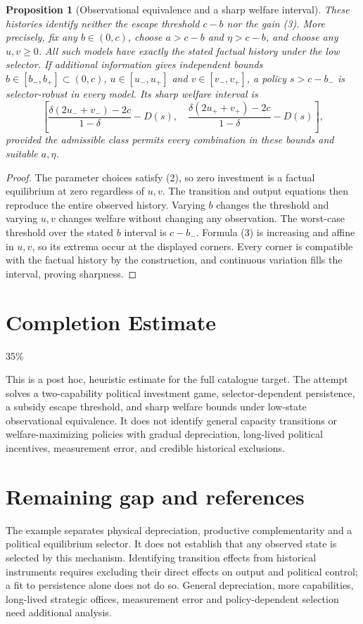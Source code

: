 \documentclass[11pt,a4paper]{article}
\newtheorem{proposition}[theorem]{Proposition}
\theoremstyle{definition}
\theoremstyle{remark}
\begin{document}
\begin{proposition}[Observational equivalence and a sharp welfare interval]
These histories identify neither the escape threshold $c-b$ nor the gain (3). More precisely, fix any $b\in(0,c)$, choose $a>c-b$ and $\eta>c-b$, and choose any $u,v\geq0$. All such models have exactly the stated factual history under the low selector. If additional information gives independent bounds $b\in[b_-,b_+]\subset(0,c)$, $u\in[u_-,u_+]$ and $v\in[v_-,v_+]$, a policy $s>c-b_-$ is selector-robust in every model. Its sharp welfare interval is
\[
 \left[\frac{\delta(2u_-+v_-)-2c}{1-\delta}-D(s),\quad
       \frac{\delta(2u_++v_+)-2c}{1-\delta}-D(s)\right],
\]
provided the admissible class permits every combination in these bounds and suitable $a,\eta$.
\end{proposition}
\begin{proof}
The parameter choices satisfy (2), so zero investment is a factual equilibrium at zero regardless of $u,v$. The transition and output equations then reproduce the entire observed history. Varying $b$ changes the threshold and varying $u,v$ changes welfare without changing any observation. The worst-case threshold over the stated $b$ interval is $c-b_-$. Formula (3) is increasing and affine in $u,v$, so its extrema occur at the displayed corners. Every corner is compatible with the factual history by the construction, and continuous variation fills the interval, proving sharpness.
\end{proof}

\section{Completion Estimate}
35\%

This is a post hoc, heuristic estimate for the full catalogue target.
The attempt solves a two-capability political investment game, selector-dependent persistence, a subsidy escape threshold, and sharp welfare bounds under low-state observational equivalence. It does not identify general capacity transitions or welfare-maximizing policies with gradual depreciation, long-lived political incentives, measurement error, and credible historical exclusions.

\section{Remaining gap and references}
The example separates physical depreciation, productive complementarity and a political equilibrium selector. It does not establish that any observed state is selected by this mechanism. Identifying transition effects from historical instruments requires excluding their direct effects on output and political control; a fit to persistence alone does not do so. General depreciation, more capabilities, long-lived strategic offices, measurement error and policy-dependent selection need additional analysis.
\end{document}
